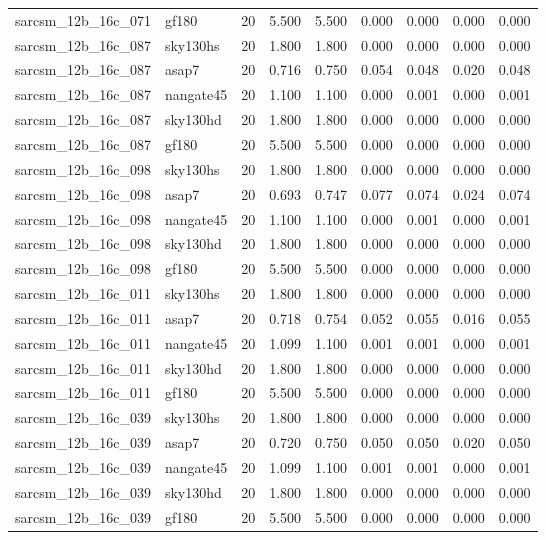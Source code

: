 \begin{tabular}{llrrrrrrr}
sarcsm\_12b\_16c\_071 & gf180 & 20 & 5.500 & 5.500 & 0.000 & 0.000 & 0.000 & 0.000 \\
sarcsm\_12b\_16c\_087 & sky130hs & 20 & 1.800 & 1.800 & 0.000 & 0.000 & 0.000 & 0.000 \\
sarcsm\_12b\_16c\_087 & asap7 & 20 & 0.716 & 0.750 & 0.054 & 0.048 & 0.020 & 0.048 \\
sarcsm\_12b\_16c\_087 & nangate45 & 20 & 1.100 & 1.100 & 0.000 & 0.001 & 0.000 & 0.001 \\
sarcsm\_12b\_16c\_087 & sky130hd & 20 & 1.800 & 1.800 & 0.000 & 0.000 & 0.000 & 0.000 \\
sarcsm\_12b\_16c\_087 & gf180 & 20 & 5.500 & 5.500 & 0.000 & 0.000 & 0.000 & 0.000 \\
sarcsm\_12b\_16c\_098 & sky130hs & 20 & 1.800 & 1.800 & 0.000 & 0.000 & 0.000 & 0.000 \\
sarcsm\_12b\_16c\_098 & asap7 & 20 & 0.693 & 0.747 & 0.077 & 0.074 & 0.024 & 0.074 \\
sarcsm\_12b\_16c\_098 & nangate45 & 20 & 1.100 & 1.100 & 0.000 & 0.001 & 0.000 & 0.001 \\
sarcsm\_12b\_16c\_098 & sky130hd & 20 & 1.800 & 1.800 & 0.000 & 0.000 & 0.000 & 0.000 \\
sarcsm\_12b\_16c\_098 & gf180 & 20 & 5.500 & 5.500 & 0.000 & 0.000 & 0.000 & 0.000 \\
sarcsm\_12b\_16c\_011 & sky130hs & 20 & 1.800 & 1.800 & 0.000 & 0.000 & 0.000 & 0.000 \\
sarcsm\_12b\_16c\_011 & asap7 & 20 & 0.718 & 0.754 & 0.052 & 0.055 & 0.016 & 0.055 \\
sarcsm\_12b\_16c\_011 & nangate45 & 20 & 1.099 & 1.100 & 0.001 & 0.001 & 0.000 & 0.001 \\
sarcsm\_12b\_16c\_011 & sky130hd & 20 & 1.800 & 1.800 & 0.000 & 0.000 & 0.000 & 0.000 \\
sarcsm\_12b\_16c\_011 & gf180 & 20 & 5.500 & 5.500 & 0.000 & 0.000 & 0.000 & 0.000 \\
sarcsm\_12b\_16c\_039 & sky130hs & 20 & 1.800 & 1.800 & 0.000 & 0.000 & 0.000 & 0.000 \\
sarcsm\_12b\_16c\_039 & asap7 & 20 & 0.720 & 0.750 & 0.050 & 0.050 & 0.020 & 0.050 \\
sarcsm\_12b\_16c\_039 & nangate45 & 20 & 1.099 & 1.100 & 0.001 & 0.001 & 0.000 & 0.001 \\
sarcsm\_12b\_16c\_039 & sky130hd & 20 & 1.800 & 1.800 & 0.000 & 0.000 & 0.000 & 0.000 \\
sarcsm\_12b\_16c\_039 & gf180 & 20 & 5.500 & 5.500 & 0.000 & 0.000 & 0.000 & 0.000 \\

\end{tabular}
